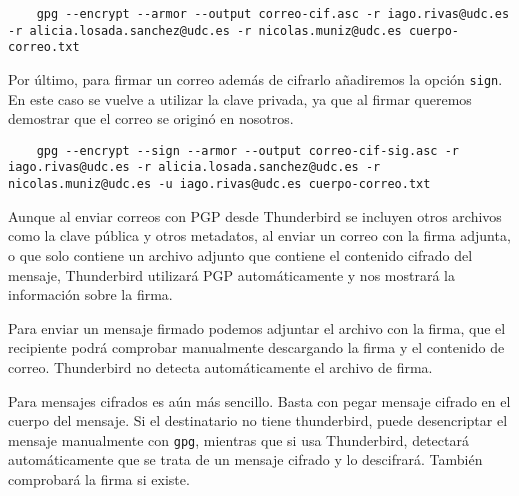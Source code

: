 \begin{verbatim}
    gpg --encrypt --armor --output correo-cif.asc -r iago.rivas@udc.es -r alicia.losada.sanchez@udc.es -r nicolas.muniz@udc.es cuerpo-correo.txt
\end{verbatim}

Por último, para firmar un correo además de cifrarlo añadiremos la opción \texttt{sign}. En este caso se vuelve a utilizar la clave privada, ya que al firmar queremos demostrar que el correo se originó en nosotros.

\begin{verbatim}
    gpg --encrypt --sign --armor --output correo-cif-sig.asc -r iago.rivas@udc.es -r alicia.losada.sanchez@udc.es -r nicolas.muniz@udc.es -u iago.rivas@udc.es cuerpo-correo.txt
\end{verbatim}

Aunque al enviar correos con PGP desde Thunderbird se incluyen otros archivos como la clave pública y otros metadatos, al enviar un correo con la firma adjunta, o que solo contiene un archivo adjunto que contiene el contenido cifrado del mensaje, Thunderbird utilizará PGP automáticamente y nos mostrará la información sobre la firma.

Para enviar un mensaje firmado podemos adjuntar el archivo con la firma, que el recipiente podrá comprobar manualmente descargando la firma y el contenido de correo. Thunderbird no detecta automáticamente el archivo de firma.

Para mensajes cifrados es aún más sencillo. Basta con pegar mensaje cifrado en el cuerpo del mensaje. Si el destinatario no tiene thunderbird, puede desencriptar el mensaje manualmente con \texttt{gpg}, mientras que si usa Thunderbird, detectará automáticamente que se trata de un mensaje cifrado y lo descifrará. También comprobará la firma si existe.